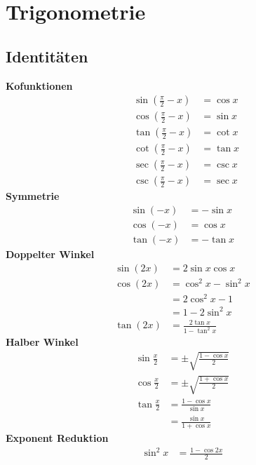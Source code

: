\section*{Trigonometrie}
\begin{multicols}{3}

\small
\begin{multicols}{2}
\subsection*{Identitäten}

\textbf{Kofunktionen}
\begin{align*}
    & \sin(\frac{\pi}{2} - x) & = \cos x \\
    & \cos(\frac{\pi}{2} - x) & = \sin x \\
    & \tan(\frac{\pi}{2} - x) & = \cot x \\
    & \cot(\frac{\pi}{2} - x) & = \tan x \\
    & \sec(\frac{\pi}{2} - x) & = \csc x \\
    & \csc(\frac{\pi}{2} - x) & = \sec x
\end{align*}
\textbf{Symmetrie}
\begin{align*}
  \sin(-x) & = - \sin x \\
  \cos(-x) & = \cos x   \\
  \tan(-x) & = -\tan x
\end{align*}
\textbf{Doppelter Winkel}
\begin{align*}
  \sin(2x) & = 2 \sin x \cos x               \\
  \cos(2x) & = \cos^2 x - \sin^2 x           \\
           & = 2 \cos^2 x - 1                \\
           & = 1 - 2 \sin^2 x                \\
  \tan(2x) & = \frac{2 \tan x}{1 - \tan^2 x}
\end{align*}
\textbf{Halber Winkel}
\begin{align*}
  \sin \frac{x}{2} & = \pm \sqrt{ \frac{1 - \cos x }{2} } \\
  \cos \frac{x}{2} & = \pm \sqrt{ \frac{1 + \cos x }{2} } \\
  \tan \frac{x}{2} & = \frac{1 - \cos x }{\sin x}         \\
                   & = \frac{ \sin x }{ 1 + \cos x }
\end{align*}
\textbf{Exponent Reduktion}
\begin{align*}
  \sin^2 x & = \frac{1 - \cos 2x}{2}               \\

\end{align*}
\end{multicols}
\end{multicols}
